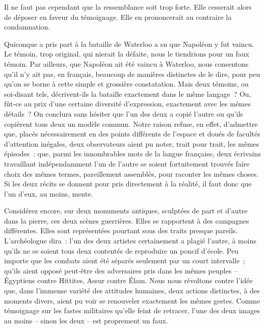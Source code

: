 \documentclass[french,twoside]{book} %
\newcommand{\astermono}{\medskip\centerline{\color{rubric}\large\selectfont{\syms ✻}}\medskip\par}%
\begin{document}
\astermono

\noindent Il ne faut pas cependant que la ressemblance soit trop forte. Elle ces­serait alors de déposer en faveur du témoignage. Elle en prononcerait au contraire la condamnation.\par
Quiconque a pris part à la bataille de Waterloo a su que Napoléon y fut vaincu. Le témoin, trop original, qui nierait la défaite, nous le tien­drions pour un faux témoin. Par ailleurs, que Napoléon ait été vaincu à Waterloo, nous consentons qu’il n’y ait pas, en français, beaucoup de manières distinctes de le dire, pour peu qu’on se borne à cette simple et grossière constatation. Mais deux témoins, ou soi-disant tels, décrivent-­ils la bataille exactement dans le même langage ? Ou, fût‑ce au prix d’une certaine diversité d’expression, exactement avec les mêmes détails ? On conclura sans hésiter que l’un des deux a copié l’autre ou qu’ils copièrent tous deux un modèle commun. Notre raison refuse, en effet, d’admettre que, placés nécessairement en des points différents de l’espace et doués de facultés d’attention inégales, deux observateurs aient pu noter, trait pour trait, les mêmes épisodes : que, parmi les innombrables mots de la langue française, deux écrivains travaillant indépendamment l’un de l’autre se soient fortuitement trouvés faire choix des mêmes termes, pareillement assemblés, pour raconter les mêmes choses. Si les deux récits se donnent pour pris directement à la réalité, il faut donc que l’un d’eux, au moins, mente.\par
Considérez encore, sur deux monuments antiques, sculptées de part et d’autre dans la pierre, ces deux scènes guerrières. Elles se rapportent à des campagnes différentes. Elles sont représentées pourtant sous des  
\label{p55} traits presque pareils. L’archéologue dira : l’un des deux artistes cer­tainement a plagié l’autre, à moins qu’ils ne se soient tous deux contentés de reproduire un poncif d’école. Peu importe que les combats aient été séparés seulement par un court intervalle ; qu’ils aient opposé peut‑être des adversaires pris dans les mêmes peuples – Égyptiens contre Hittites, Assur contre Élam. Nous nous révoltons contre l’idée que, dans l’immense variété des attitudes humaines, deux actions distinctes, à des moments divers, aient pu voir se renouveler exactement les mêmes gestes. Comme témoignage sur les fastes militaires qu’elle feint de retracer, l’une des deux images au moins – sinon les deux – est proprement un faux.\par
\end{document}
